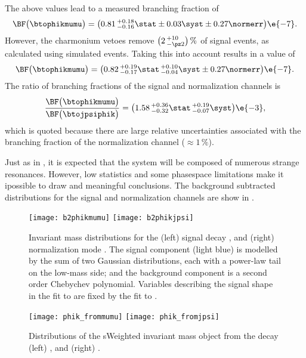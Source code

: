 The above values lead to a measured branching fraction of
\begin{equation}
  \BF\big(\btophikmumu\big)=
  \big(0.81\,^{+0.18}_{-0.16}\stat\pm0.03\syst\pm0.27\normerr\big)\e{-7}.
\end{equation}
However, the charmonium vetoes remove $\big(2\,^{+10}_{-\pz2}\big)\,\%$ of signal events, as
calculated using simulated events.
Taking this into account results in a value of
\begin{equation}
  \BF\big(\btophikmumu\big)=
  \big(0.82\,^{+0.19}_{-0.17}\stat\,^{+0.10}_{-0.04}\syst\pm0.27\normerr\big)\e{-7}.
\end{equation}
The ratio of branching fractions of the signal and normalization channels is
\begin{equation}
  \frac{ \BF\big(\btophikmumu\big) }{ \BF\big(\btojpsiphik\big) }
  =\big(1.58\,^{+0.36}_{-0.32}\stat\,^{+0.19}_{-0.07}\syst\big)\e{-3},
\end{equation}
which is quoted because there are large relative uncertainties associated with the branching
fraction of the normalization channel ($\approx1\,\%$).

Just as in \kpipi, it is expected that the \phik system will be composed of numerous strange
resonances.
However, low statistics and some phasespace limitations make it ipossible to draw and meaningful
conclusions.
The background subtracted \phik distributions for the signal and normalization channels are show in
.


\begin{figure}
  \begin{center}
    \texttt{[image: b2phikmumu]}
    \texttt{[image: b2phikjpsi]}
    \caption[Fits to \btokphimumu and \btojpsiphik]
    {\small
      Invariant mass distributions for the
      (left) signal decay \btophikmumu, and
      (right) normalization mode \btojpsiphik.
      The signal component (light blue) is modelled by the sum of two Gaussian distributions, each
      with a power-law tail on the low-mass side; and the background component is a second order
      Chebychev polynomial.
      Variables describing the signal shape in the fit to \btophikmumu are fixed by the fit to
      \btojpsiphik.
    }
    \label{fig:phik:fit}
  \end{center}
\end{figure}


\begin{figure}
  \begin{center}
    \texttt{[image: phik\_frommumu]}
    \texttt{[image: phik\_fromjpsi]}
    \caption[Invariant mass distributions of \phik]
    {\small
      Distributions of the sWeighted invariant mass \phik object from the decay
      (left) \btophikmumu, and
      (right) \btojpsiphik.
    }
    \label{fig:phik:phik}
  \end{center}
\end{figure}




